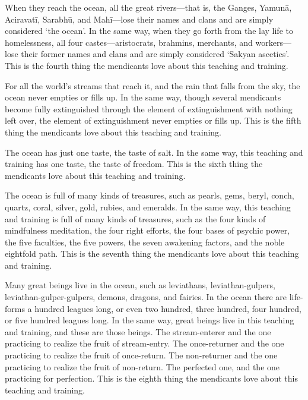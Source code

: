 \documentclass[12pt,openany]{book}%
\begin{document}
When they reach the ocean, all the great rivers—that is, the Ganges, \textsanskrit{Yamunā}, \textsanskrit{Aciravatī}, \textsanskrit{Sarabhū}, and \textsanskrit{Mahī}—lose their names and clans and are simply considered ‘the ocean’. In the same way, when they go forth from the lay life to homelessness, all four castes—aristocrats, brahmins, merchants, and workers—lose their former names and clans and are simply considered ‘Sakyan ascetics’. This is the fourth thing the mendicants love about this teaching and training. 

For all the world’s streams that reach it, and the rain that falls from the sky, the ocean never empties or fills up. In the same way, though several mendicants become fully extinguished through the element of extinguishment with nothing left over, the element of extinguishment never empties or fills up. This is the fifth thing the mendicants love about this teaching and training. 

The ocean has just one taste, the taste of salt. In the same way, this teaching and training has one taste, the taste of freedom. This is the sixth thing the mendicants love about this teaching and training. 

The ocean is full of many kinds of treasures, such as pearls, gems, beryl, conch, quartz, coral, silver, gold, rubies, and emeralds. In the same way, this teaching and training is full of many kinds of treasures, such as the four kinds of mindfulness meditation, the four right efforts, the four bases of psychic power, the five faculties, the five powers, the seven awakening factors, and the noble eightfold path. This is the seventh thing the mendicants love about this teaching and training. 

Many great beings live in the ocean, such as leviathans, leviathan-gulpers, leviathan-gulper-gulpers, demons, dragons, and fairies. In the ocean there are life-forms a hundred leagues long, or even two hundred, three hundred, four hundred, or five hundred leagues long. In the same way, great beings live in this teaching and training, and these are those beings. The stream-enterer and the one practicing to realize the fruit of stream-entry. The once-returner and the one practicing to realize the fruit of once-return. The non-returner and the one practicing to realize the fruit of non-return. The perfected one, and the one practicing for perfection. This is the eighth thing the mendicants love about this teaching and training. 
\end{document}
